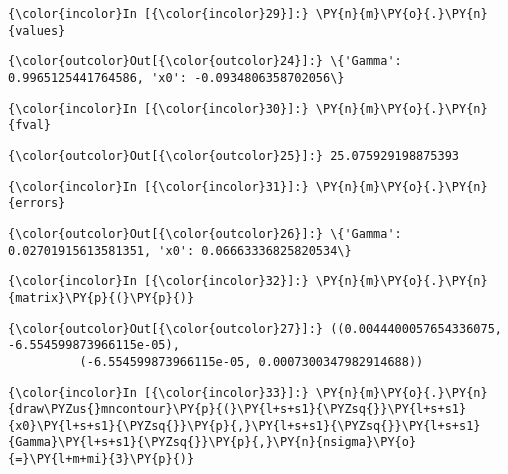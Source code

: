     \begin{Verbatim}[commandchars=\\\{\}]
{\color{incolor}In [{\color{incolor}29}]:} \PY{n}{m}\PY{o}{.}\PY{n}{values}
\end{Verbatim}


\begin{Verbatim}[commandchars=\\\{\}]
{\color{outcolor}Out[{\color{outcolor}24}]:} \{'Gamma': 0.9965125441764586, 'x0': -0.0934806358702056\}
\end{Verbatim}
            
    \begin{Verbatim}[commandchars=\\\{\}]
{\color{incolor}In [{\color{incolor}30}]:} \PY{n}{m}\PY{o}{.}\PY{n}{fval}
\end{Verbatim}


\begin{Verbatim}[commandchars=\\\{\}]
{\color{outcolor}Out[{\color{outcolor}25}]:} 25.075929198875393
\end{Verbatim}
            
    \begin{Verbatim}[commandchars=\\\{\}]
{\color{incolor}In [{\color{incolor}31}]:} \PY{n}{m}\PY{o}{.}\PY{n}{errors}
\end{Verbatim}


\begin{Verbatim}[commandchars=\\\{\}]
{\color{outcolor}Out[{\color{outcolor}26}]:} \{'Gamma': 0.02701915613581351, 'x0': 0.06663336825820534\}
\end{Verbatim}
            
    \begin{Verbatim}[commandchars=\\\{\}]
{\color{incolor}In [{\color{incolor}32}]:} \PY{n}{m}\PY{o}{.}\PY{n}{matrix}\PY{p}{(}\PY{p}{)}
\end{Verbatim}


\begin{Verbatim}[commandchars=\\\{\}]
{\color{outcolor}Out[{\color{outcolor}27}]:} ((0.0044400057654336075, -6.554599873966115e-05),
          (-6.554599873966115e-05, 0.0007300347982914688))
\end{Verbatim}
            
    \begin{Verbatim}[commandchars=\\\{\}]
{\color{incolor}In [{\color{incolor}33}]:} \PY{n}{m}\PY{o}{.}\PY{n}{draw\PYZus{}mncontour}\PY{p}{(}\PY{l+s+s1}{\PYZsq{}}\PY{l+s+s1}{x0}\PY{l+s+s1}{\PYZsq{}}\PY{p}{,}\PY{l+s+s1}{\PYZsq{}}\PY{l+s+s1}{Gamma}\PY{l+s+s1}{\PYZsq{}}\PY{p}{,}\PY{n}{nsigma}\PY{o}{=}\PY{l+m+mi}{3}\PY{p}{)}
\end{Verbatim}


